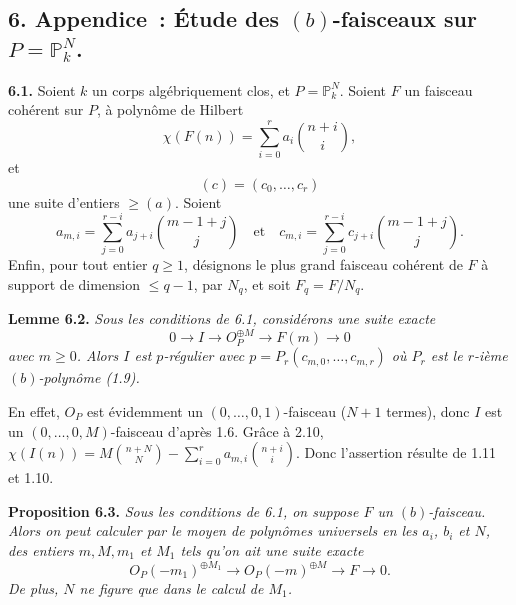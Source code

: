 
\subsection*{6. Appendice~: \'Etude des $(b)$-faisceaux sur $P=\mathbb P^N_k$.}

\textbf{6.1.} Soient $k$ un corps alg\'ebriquement clos, et $P=\mathbb P^N_k$. Soient $F$ un faisceau coh\'erent sur $P$, \`a polyn\^ome de Hilbert
\[
   \chi(F(n))=\sum_{i=0}^{r} a_i \binom{n+i}{i},
\]
et
\[
   (c)=(c_0,\ldots,c_r)
\]
une suite d'entiers $\ge (a)$. Soient
\[
   a_{m,i}=\sum_{j=0}^{r-i}a_{j+i}\binom{m-1+j}{j}\quad\text{et}\quad c_{m,i}=\sum_{j=0}^{r-i}c_{j+i}\binom{m-1+j}{j}.
\]
Enfin, pour tout entier $q\ge1$, d\'esignons le plus grand faisceau coh\'erent de $F$ \`a support de dimension $\le q-1$, par $N_q$, et soit $F_q=F/N_q$.

\textbf{Lemme 6.2.} \emph{Sous les conditions de 6.1, consid\'erons une suite exacte}
\[
   0\longrightarrow I\longrightarrow {O}_P^{\oplus M}\longrightarrow F(m)\longrightarrow0
\]
\emph{avec $m\ge0$. Alors $I$ est $p$-r\'egulier avec \(p=P_r(c_{m,0},\ldots,c_{m,r})\) o\`u $P_r$ est le $r$-i\`eme $(b)$-polyn\^ome (1.9).}

En effet, ${O}_P$ est \'evidemment un $(0,\ldots,0,1)$-faisceau ($N+1$ termes), donc $I$ est un $(0,\ldots,0,M)$-faisceau d'apr\`es 1.6. Gr\^ace \`a 2.10, \(\chi(I(n))=M\binom{n+N}{N}-\sum_{i=0}^{r} a_{m,i}\binom{n+i}{i}\). Donc l'assertion r\'esulte de 1.11 et 1.10.

\textbf{Proposition 6.3.} \emph{Sous les conditions de 6.1, on suppose $F$ un $(b)$-faisceau. Alors on peut calculer par le moyen de polyn\^omes universels en les $a_i$, $b_i$ et $N$, des entiers $m, M, m_1$ et $M_1$ tels qu'on ait une suite exacte}
\[
   {O}_P(-m_1)^{\oplus M_1}\longrightarrow
   {O}_P(-m)^{\oplus M}\longrightarrow F\longrightarrow0.
\]
\emph{De plus, $N$ ne figure que dans le calcul de $M_1$.}

